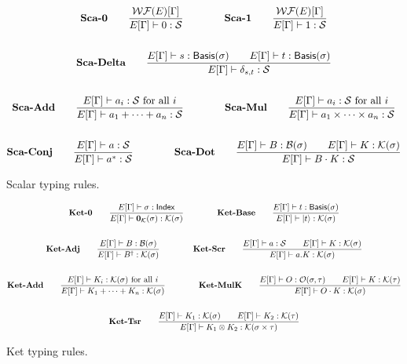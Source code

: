\documentclass{article}
\begin{document}
\begin{figure}[h]
    \begin{gather*}
        \textbf{Sca-0} \qquad
        \frac{\mathcal{WF}(E)[\Gamma]}{E[\Gamma] \vdash 0 : \mathcal{S}}
        \qquad \qquad
        \textbf{Sca-1} \qquad
        \frac{\mathcal{WF}(E)[\Gamma]}{E[\Gamma] \vdash 1 : \mathcal{S}} \\
        \\
        \textbf{Sca-Delta} \qquad
        \frac{ E[\Gamma]\vdash s : \mathsf{Basis}(\sigma) \qquad E[\Gamma]\vdash t : \mathsf{Basis}(\sigma) } {E[\Gamma] \vdash \delta_{s, t} : \mathcal{S}} \\
        \\
        \textbf{Sca-Add} \qquad
        \frac{E[\Gamma]\vdash a_i : \mathcal{S} \text{ for all $i$}}{E[\Gamma]\vdash a_1 + \cdots + a_n : \mathcal{S}}
        \qquad \qquad
        \textbf{Sca-Mul} \qquad
        \frac{E[\Gamma]\vdash a_i : \mathcal{S} \text{ for all $i$}}{E[\Gamma]\vdash a_1 \times \cdots \times a_n : \mathcal{S}} \\
        \\
        \textbf{Sca-Conj} \qquad
        \frac{E[\Gamma] \vdash a : \mathcal{S}}{E[\Gamma] \vdash a^*:\mathcal{S}}
        \qquad \qquad
        \textbf{Sca-Dot} \qquad
        \frac{E[\Gamma]\vdash B : \mathcal{B}(\sigma) \qquad E[\Gamma]\vdash K : \mathcal{K}(\sigma)}{E[\Gamma] \vdash B \cdot K : \mathcal{S}}
    \end{gather*}
    \caption{Scalar typing rules.}
\end{figure}



\begin{figure}[h]
    \begin{gather*}
        \textbf{Ket-0} \qquad
        \frac{E[\Gamma] \vdash \sigma : \mathsf{Index}}{E[\Gamma] \vdash \mathbf{0}_\mathcal{K}(\sigma) : \mathcal{K}(\sigma)} 
        \qquad \qquad
        \textbf{Ket-Base} \qquad
        \frac{E[\Gamma]\vdash t : \mathsf{Basis}(\sigma)}{E[\Gamma] \vdash \ket{t} : \mathcal{K}(\sigma)} \\
        \\
        \textbf{Ket-Adj} \qquad
        \frac{E[\Gamma] \vdash B : \mathcal{B}(\sigma)}{E[\Gamma] \vdash B^\dagger : \mathcal{K}(\sigma)} 
        \qquad \qquad
        \textbf{Ket-Scr} \qquad
        \frac{E[\Gamma] \vdash a : \mathcal{S} \qquad E[\Gamma] \vdash K : \mathcal{K}(\sigma)}{E[\Gamma] \vdash a.K : \mathcal{K}(\sigma)} \\
        \\
        \textbf{Ket-Add} \qquad
        \frac{E[\Gamma] \vdash K_i : \mathcal{K}(\sigma) \text{ for all $i$}}{E[\Gamma] \vdash K_1 + \cdots + K_n : \mathcal{K}(\sigma)}
        \qquad \qquad
        \textbf{Ket-MulK} \qquad
        \frac{E[\Gamma] \vdash O : \mathcal{O}(\sigma, \tau) \qquad E[\Gamma] \vdash K : \mathcal{K}(\tau)}{E[\Gamma] \vdash O \cdot K : \mathcal{K}(\sigma)} \\
        \\
        \textbf{Ket-Tsr} \qquad
        \frac{E[\Gamma] \vdash K_1 : \mathcal{K}(\sigma) \qquad E[\Gamma] \vdash K_2 : \mathcal{K}(\tau)} {E[\Gamma] \vdash K_1 \otimes K_2 : \mathcal{K}(\sigma \times \tau)}
    \end{gather*}
    \caption{Ket typing rules.}
\end{figure}
\end{document}
